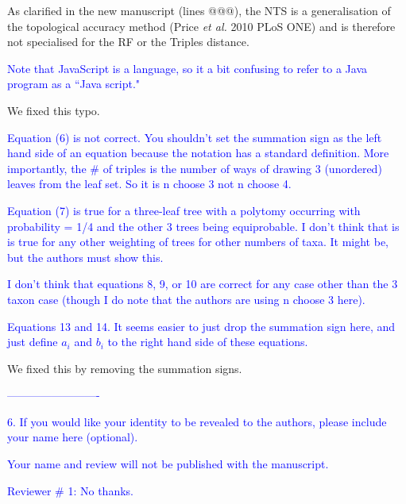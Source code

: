 \documentclass[11pt]{letter}
\begin{document}
\begin{letter}{}
As clarified in the new manuscript (lines @@@), the NTS is a generalisation of the topological accuracy method (Price \textit{et al.} 2010 PLoS ONE) and is therefore not specialised for the RF or the Triples distance.


\textcolor{blue}{Note that JavaScript is a language, so it a bit confusing to refer to a Java program as a ``Java script."}

We fixed this typo.


\textcolor{blue}{Equation (6) is not correct. You shouldn't set the summation sign as the left hand side of an equation because the notation has a standard definition. More importantly, the $\#$ of triples is the number of ways of drawing 3 (unordered) leaves from the leaf set. So it is n choose 3 not n choose 4.}



\textcolor{blue}{Equation (7) is true for a three-leaf tree with a polytomy occurring with probability = 1/4 and the other 3 trees being equiprobable. I don't think that is is true for any other weighting of trees for other numbers of taxa. It might be, but the authors must show this.}



\textcolor{blue}{I don't think that equations 8, 9, or 10 are correct for any case other than the 3 taxon case (though I do note that the authors are using n choose 3 here).}



\textcolor{blue}{Equations 13 and 14. It seems easier to just drop the summation sign here, and just define $a_i$ and $b_i$ to the right hand side of these equations.}

We fixed this by removing the summation signs.


\textcolor{blue}{-------------------------}

\textcolor{blue}{6. If you would like your identity to be revealed to the authors, please include your name here (optional).}


\textcolor{blue}{Your name and review will not be published with the manuscript.}


\textcolor{blue}{Reviewer $\#$ 1: No thanks.}



\end{letter}
\end{document}
